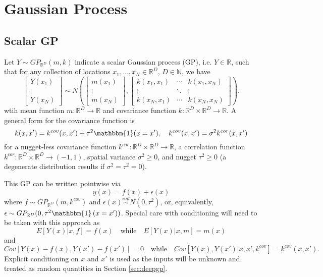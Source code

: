 \documentclass{article}
\newcommand{\ind}{\stackrel{ind}{\sim}}
\newcommand{\1}{\mathbbm{1}}
\begin{document}
\section{Gaussian Process}

\subsection{Scalar GP}

Let $Y\sim GP_{\mathbb{R}^{D}}(m,k)$ indicate a scalar Gaussian process (GP),
i.e. $Y\in \mathbb{R}$,
such that for any collection of locations $x_1,\ldots,x_N \in \mathbb{R}^{D}$,
$D \in \mathbb{N}$, 
we have
\[
\left[ \begin{array}{c} Y(x_1) \\ \vdots \\ Y(x_N) \end{array}  \right] \sim 
N\left(\left[\begin{array}{c}
m(x_1) \\ \vdots \\ m(x_N)
\end{array} \right], 
\left[ \begin{array}{ccc}
k(x_1,x_1) & \cdots & k(x_1,x_N) \\
\vdots & \ddots & \vdots \\
k(x_N,x_1) & \cdots & k(x_N,x_N) 
\end{array} \right] \right).
\]
wtih mean function $m: \mathbb{R}^{D} \to \mathbb{R}$ and 
covariance function $k: \mathbb{R}^{D}\times \mathbb{R}^{D} \to \mathbb{R}$.
A general form for the covariance function is 
\[
k(x,x') = k^{cov}(x,x') + \tau^2\1(x=x'), \quad 
k^{cov}(x,x')  = \sigma^2 k^{cor}(x,x') 
\]
for a nugget-less covariance function 
$k^{cov}: \mathbb{R}^{D}\times \mathbb{R}^{D} \to \mathbb{R}$, 
a correlation function 
$k^{cor}: \mathbb{R}^{D}\times \mathbb{R}^{D} \to (-1,1)$, 
spatial variance $\sigma^2\ge 0$, and nugget $\tau^2\ge 0$
(a degenerate distribution results if $\sigma^2=\tau^2=0$).

This GP can be written pointwise via 
\[
y(x) = f(x) + \epsilon(x)
\]
where $f\sim GP_{\mathbb{R}^D}\left(m,k^{cov}\right)$ and 
$\epsilon(x) \ind N(0,\tau^2)$, or, equivalently, 
$\epsilon \sim GP_{\mathbb{R}^D}(0,\tau^2\1\left(x=x')\right)$.
Special care with conditioning will need to be taken with this approach as 
\[
E[Y(x)|x,f] = f(x) \quad \mbox{while} \quad E[Y(x)|x,m] = m(x)
\]
and 
\[
Cov[Y(x)-f(x),Y(x')-f(x')] = 0 
\quad \mbox{while} \quad
Cov[Y(x),Y(x')|x,x',k^{cov}] = k^{cov}(x,x').
\]
Explicit conditioning on $x$ and $x'$ is used as the inputs will be unknown
and treated as random quantities in Section \ref{sec:deepgp}.
\end{document}
